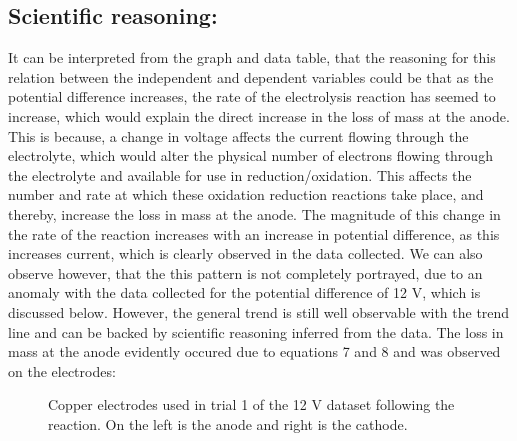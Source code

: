 \documentclass[11pt, a4]{article}
\begin{document}
		\subsection{Scientific reasoning:}
			It can be interpreted from the graph and data table, that the reasoning for this relation between the independent and dependent variables could be that as the potential difference increases, the rate of the electrolysis reaction has seemed to increase, which would explain the direct increase in the loss of mass at the anode. This is because, a change in voltage affects the current flowing through the electrolyte, which would alter the physical number of electrons flowing through the electrolyte and available for use in reduction/oxidation. This affects the number and rate at which these oxidation reduction reactions take place, and thereby, increase the loss in mass at the anode. The magnitude of this change in the rate of the reaction increases with an increase in potential difference, as this increases current, which is clearly observed in the data collected. We can also observe however, that the this pattern is not completely portrayed, due to an anomaly with the data collected for the potential difference of 12 V, which is discussed below. However, the general trend is still well observable with the trend line and can be backed by scientific reasoning inferred from the data. The loss in mass at the anode evidently occured due to equations 7 and 8 and was observed on the electrodes:
			
			\begin{figure}[H]
				\vspace{-2mm}
				\begin{center}
				\end{center}
				\caption{Copper electrodes used in trial 1 of the 12 V dataset following the reaction. On the left is the anode and right is the cathode.}
			\end{figure}
			
\end{document}
